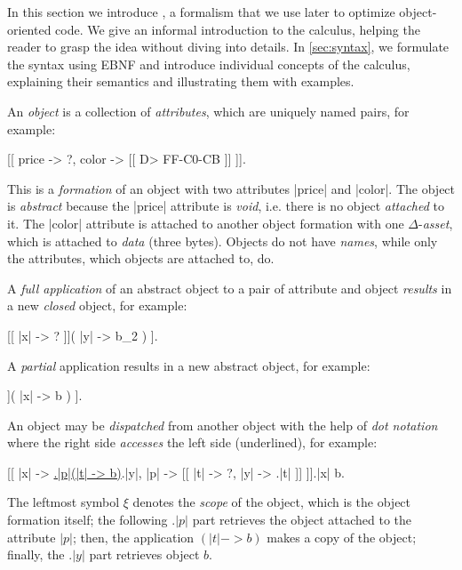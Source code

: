 
In this section we introduce \phic{}, a formalism that we use later to optimize object-oriented code.
We give an informal introduction to the calculus, helping the reader to grasp the idea without diving into details.
In \cref{sec:syntax}, we formulate the syntax using EBNF and introduce individual concepts of the calculus, explaining their semantics and illustrating them with examples.

An \emph{object} is a collection of \emph{attributes}, which are uniquely named pairs, for example:
\begin{phiquation}
\label{eq:price-color}
[[ price -> ?, color -> [[ D> FF-C0-CB ]] ]].
\end{phiquation}
This is a \emph{formation} of an object with two attributes |price| and |color|.
The object is \emph{abstract} because the |price| attribute is \emph{void}, i.e. there is no object \emph{attached} to it.
The |color| attribute is attached to another object formation with one \(\Delta\)-\emph{asset}, which is attached to \emph{data} (three bytes).
Objects do not have \emph{names}, while only the attributes, which objects are attached to, do.

A \emph{full application} of an abstract object to a pair of attribute and object \emph{results} in a new \emph{closed} object, for example:
\begin{phiquation}
\label{eq:simple-application}
[[ |x| -> ? ]]( |y| -> b_2 ) \trans [[ |x| -> b_2 ]].
\end{phiquation}
A \emph{partial} application results in a new abstract object, for example:
\begin{phiquation*}
[[ |x| -> ?, |y| -> ? ]]( |x| -> b ) \trans [[ |x| -> b, |y| -> ? ]].
\end{phiquation*}

An object may be \emph{dispatched} from another object with the help of \emph{dot notation} where the right side \emph{accesses} the left side (underlined), for example:
\begin{phiquation}
\label{eq:dot-notation}
[[ |x| -> \underline{\xi.|p|(|t| -> b)}.|y|, |p| -> [[ |t| -> ?, |y| -> \xi.|t| ]] ]].|x| \trans b.
\end{phiquation}
The leftmost symbol \(\xi\) denotes the \emph{scope} of the object,
which is the object formation itself; the following \(.|p|\) part
retrieves the object attached to the attribute \(|p|\);
then, the application $(|t|->b)$ makes a copy of the object;
finally, the \(.|y|\) part retrieves object \(b\).

